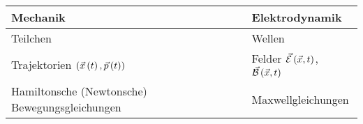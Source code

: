 \setlength{\tabcolsep}{1cm}
\renewcommand{\arraystretch}{2}
\begin{tabular}{l l}\hline
  Mechanik & Elektrodynamik \\\hline
  Teilchen & Wellen \\
  Trajektorien $\left( \vec{x}\left(t\right),\vec{p}\left(t\right) \right)$ & Felder $\vec{\mathcal{E}}\left(\vec{x},t\right)$, $\vec{\mathcal{B}}\left(\vec{x},t\right)$ \\
  Hamiltonsche (Newtonsche) Bewegungsgleichungen & Maxwellgleichungen
\end{tabular}
